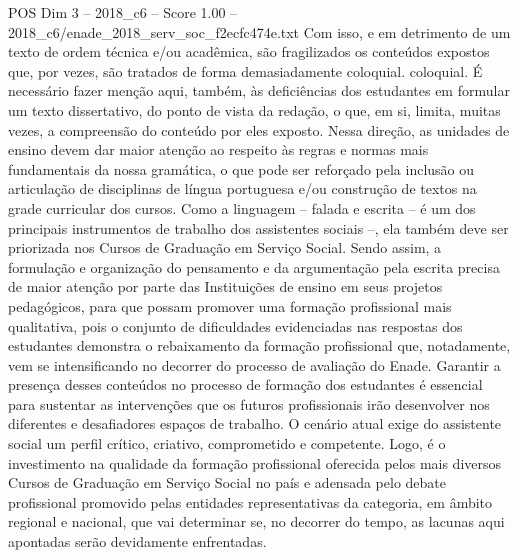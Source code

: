 \begin{textsample}{POS Dim 3 – 2018\_c6 – Score 1.00 – 2018\_c6/enade\_2018\_serv\_soc\_f2ecfc474e.txt}
Com isso, e em detrimento de um texto de ordem técnica e/ou acadêmica, são fragilizados os conteúdos expostos que, por vezes, são tratados de forma demasiadamente coloquial. coloquial.
É necessário fazer menção aqui, também, às deficiências dos estudantes em formular um texto dissertativo, do ponto de vista da redação, o que, em si, limita, muitas vezes, a compreensão do conteúdo por eles exposto.
Nessa direção, as unidades de ensino devem dar maior atenção ao respeito às regras e normas mais fundamentais da nossa gramática, o que pode ser reforçado pela inclusão ou articulação de disciplinas de língua portuguesa e/ou construção de textos na grade curricular dos cursos.
Como a linguagem – falada e escrita – é um dos principais instrumentos de trabalho dos assistentes sociais –, ela também deve ser priorizada nos Cursos de Graduação em Serviço Social.
Sendo assim, a formulação e organização do pensamento e da argumentação pela escrita precisa de maior atenção por parte das Instituições de ensino em seus projetos pedagógicos, para que possam promover uma formação profissional mais qualitativa, pois o conjunto de dificuldades evidenciadas nas respostas dos estudantes demonstra o rebaixamento da formação profissional que, notadamente, vem se intensificando no decorrer do processo de avaliação do Enade.
Garantir a presença desses conteúdos no processo de formação dos estudantes é essencial para sustentar as intervenções que os futuros profissionais irão desenvolver nos diferentes e desafiadores espaços de trabalho.
O cenário atual exige do assistente social um perfil crítico, criativo, comprometido e competente.
Logo, é o investimento na qualidade da formação profissional oferecida pelos mais diversos Cursos de Graduação em Serviço Social no país e adensada pelo debate profissional promovido pelas entidades representativas da categoria, em âmbito regional e nacional, que vai determinar se, no decorrer do tempo, as lacunas aqui apontadas serão devidamente enfrentadas.

\end{textsample}
